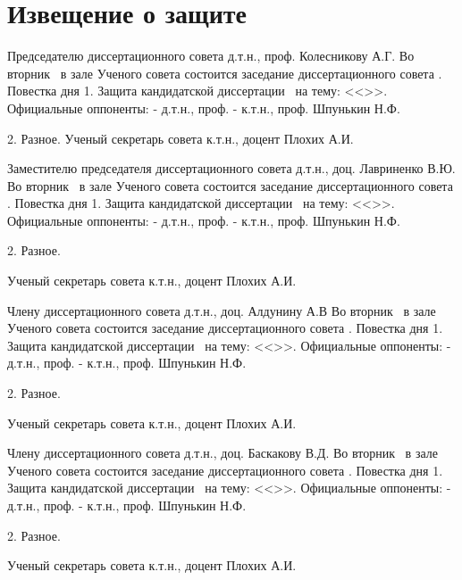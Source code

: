 


\section{Извещение о защите}

Председателю диссертационного совета
д.т.н., проф. Колесникову А.Г.
Во вторник \ в зале Ученого совета состоится заседание диссертационного совета . 
Повестка дня
1.	Защита кандидатской диссертации \thesisAuthorLastNameKemFull\ на тему: <<\thesisTitle>>.
Официальные оппоненты:	- д.т.н., проф.	\opponentOneFioShort 
- к.т.н., проф.	Шпунькин Н.Ф.

2.	Разное. 
Ученый секретарь совета
к.т.н., доцент		Плохих А.И. 



Заместителю председателя диссертационного совета
д.т.н., доц. Лавриненко В.Ю.
Во вторник \ в зале Ученого совета состоится заседание диссертационного совета .
Повестка дня
1.	Защита кандидатской диссертации \thesisAuthorLastNameKemFull\ на тему: <<\thesisTitle>>.
Официальные оппоненты:	- д.т.н., проф.	\opponentOneFioShort 
- к.т.н., проф.	Шпунькин Н.Ф.

2.	Разное.

Ученый секретарь совета
к.т.н., доцент		Плохих А.И. 



Члену диссертационного совета
д.т.н., доц. Алдунину А.В
Во вторник \ в зале Ученого совета состоится заседание диссертационного совета .
Повестка дня
1.	Защита кандидатской диссертации \thesisAuthorLastNameKemFull\ на тему: <<\thesisTitle>>.
Официальные оппоненты:	- д.т.н., проф.	\opponentOneFioShort
- к.т.н., проф.	Шпунькин Н.Ф.

2.	Разное.

Ученый секретарь совета
к.т.н., доцент		Плохих А.И. 



Члену диссертационного совета
д.т.н., доц. Баскакову В.Д.
Во вторник \ в зале Ученого совета состоится заседание диссертационного совета .
Повестка дня
1.	Защита кандидатской диссертации \thesisAuthorLastNameKemFull\ на тему: <<\thesisTitle>>.
Официальные оппоненты:	- д.т.н., проф.	\opponentOneFioShort
- к.т.н., проф.	Шпунькин Н.Ф.

2.	Разное.

Ученый секретарь совета
к.т.н., доцент		Плохих А.И. 



